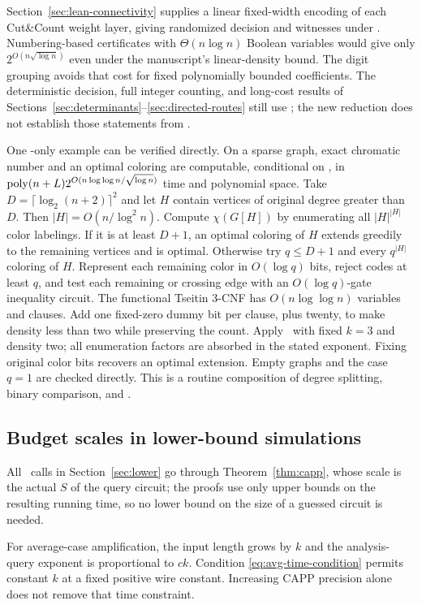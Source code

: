 Section~\ref{sec:lean-connectivity} supplies a linear fixed-width encoding
of each Cut\&Count weight layer, giving randomized decision and witnesses
under \HLean. Numbering-based certificates with $\Theta(n\log n)$
Boolean variables would give only $2^{O(n\sqrt{\log n})}$ even under
the manuscript's linear-density bound. The digit grouping avoids that
cost for fixed polynomially bounded coefficients. The deterministic
decision, full integer counting, and long-cost results of
Sections~\ref{sec:determinants}--\ref{sec:directed-routes} still use \HTC;
the new reduction does not establish those statements from \HLean.

One \HBB-only example can be verified directly. On a sparse graph,
exact chromatic number and an optimal coloring are computable,
conditional on \HBB, in
$\operatorname{poly}(n+L)2^{O(n\log\log n/\sqrt{\log n})}$ time and polynomial
space. Take $D=\lceil\log_2(n+2)\rceil^2$ and let $H$ contain
vertices of original degree greater than $D$. Then
$|H|=O(n/\log^2n)$. Compute $\chi(G[H])$ by enumerating all
$|H|^{|H|}$ color labelings. If it is at least $D+1$, an optimal
coloring of $H$ extends greedily to the remaining vertices and is
optimal. Otherwise try $q\le D+1$ and every $q^{|H|}$ coloring of
$H$. Represent each remaining color in $O(\log q)$ bits, reject
codes at least $q$, and test each remaining or crossing edge with an
$O(\log q)$-gate inequality circuit. The functional Tseitin 3-CNF
has $O(n\log\log n)$ variables and clauses. Add one fixed-zero dummy
bit per clause, plus twenty, to make density less than two while
preserving the count. Apply \HBB\ with fixed $k=3$ and density two;
all enumeration factors are absorbed in the stated exponent. Fixing
original color bits recovers an optimal extension. Empty graphs and
the case $q=1$ are checked directly. This is a routine
composition of degree splitting, binary comparison, and \HBB.

\subsection{Budget scales in lower-bound simulations}

All \HTC\ calls in Section~\ref{sec:lower} go through
Theorem~\ref{thm:capp}, whose scale is the actual $S$ of the query
circuit; the proofs use only upper bounds on the resulting running time,
so no lower bound on the size of a guessed circuit is needed.

For average-case amplification, the input length grows by $k$ and the
analysis-query exponent is proportional to $ck$. Condition
\eqref{eq:avg-time-condition} permits constant $k$ at a fixed positive
wire constant. Increasing CAPP precision alone does not remove that
time constraint.

